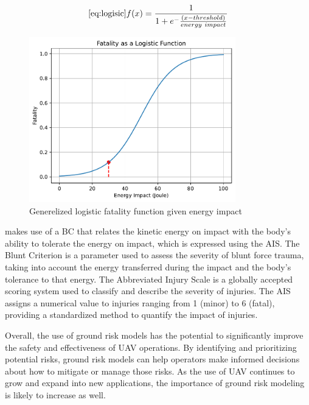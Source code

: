 \documentclass[12pt]{report}
\begin{document}
            \begin{equation}\ref{eq:logisic}
                f(x) = \frac{1}{1+e^-\frac{(x-threshold)}{energy \ impact}}
            \end{equation}

            \begin{figure}[H]\label{fig:logistic}
                \centering
                \includegraphics[width=0.8\textwidth]{Plot/logistic_bounded.pdf}
                \caption{Generelized logistic fatality function given energy impact}
            \end{figure}

            \cite{magister_small_2010} makes use of a \ac{BC} that relates the kinetic energy on impact with the body's
            ability to tolerate the energy on impact, which is expressed using the \ac{AIS}. The Blunt Criterion is a
            parameter used to assess the severity of blunt force trauma, taking into account the energy transferred
            during the impact and the body's tolerance to that energy. The Abbreviated Injury Scale  is a globally
            accepted scoring system used to classify and describe the severity of injuries. The AIS assigns a numerical
            value to injuries ranging from 1 (minor) to 6 (fatal), providing a standardized method to quantify the
            impact of injuries.

        Overall, the use of ground risk models has the potential to significantly improve the safety and
        effectiveness of UAV operations. By identifying and prioritizing potential risks, ground risk models can help
        operators make informed decisions about how to mitigate or manage those risks. As the use of UAV continues to
        grow and expand into new applications, the importance of ground risk modeling is likely to increase as well.
\end{document}
